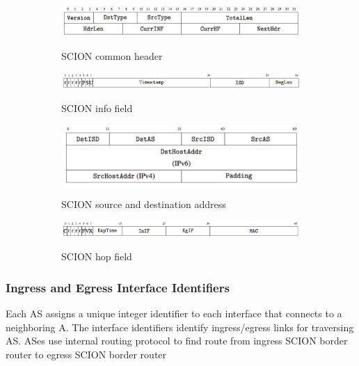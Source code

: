 \documentclass[11pt,oneside,a4paper]{article}
\begin{document}
\begin{figure}[t!]
	\begin{subfigure}[t]{.5\textwidth}
		\centering
		\includegraphics[width=\linewidth]{figures/scion_common_header}
		\label{fig:scion_common_header}
		\caption{SCION common header}
	\end{subfigure}
	\hfill
	\begin{subfigure}[t]{.5\textwidth}
		\centering
		\includegraphics[width=\linewidth]{figures/scion_info_field}
		\label{fig:scion_info_field}
		\caption{SCION info field}
	\end{subfigure}
	
	\medskip
	
	\begin{subfigure}[t]{.5\textwidth}
		\centering
		\includegraphics[width=\linewidth]{figures/scion_address_header}
		\label{fig:scion_address_header}
		\caption{SCION source and destination address}
	\end{subfigure}
	\hfill
	\begin{subfigure}[t]{.5\textwidth}
		\centering
		\includegraphics[width=\linewidth]{figures/scion_hop_field}
		\label{fig:scion_hop_field}
		\caption{SCION hop field}
	\end{subfigure}
	\caption{}
\end{figure}

\subsubsection{Ingress and Egress Interface Identifiers}

Each AS assigns a unique integer identifier to each interface that connects to a neighboring A. The interface identifiers identify ingress/egress links for traversing AS. ASes use internal routing protocol to find route from ingress SCION border router to egress SCION border router
\end{document}
